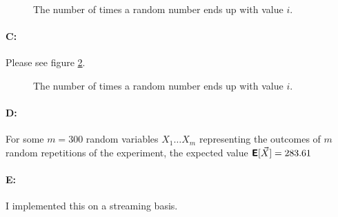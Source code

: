 \documentclass[11pt]{article}
\newcommand{\E}{\textbf{\textsf{E}}}
\begin{document}
\begin{figure}[h]
\caption{The number of times a random number ends up with value $i$.}
\label{fig:hist}
\end{figure}

\paragraph*{C:} Please see figure \ref{fig:cdp2}.

\begin{figure}[h]
\caption{The number of times a random number ends up with value $i$.}
\label{fig:cdp2}
\end{figure}

\paragraph*{D:} For some $m = 300$ random variables $X_1 \ldots X_m$ representing the outcomes of $m$ random repetitions of the experiment, the expected value $\E[\vec{X}] = 283.61$

\paragraph*{E:} I implemented this on a streaming basis.
\end{document}
